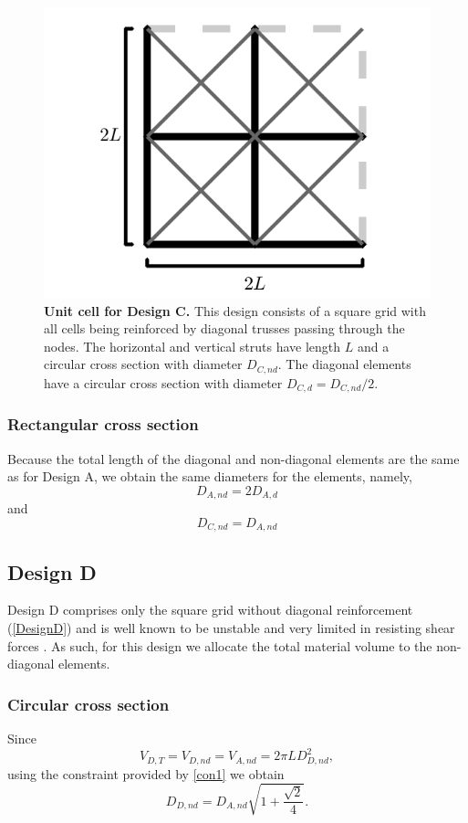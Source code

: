 \documentclass[10pt,twoside]{fernandes_supp}
\begin{document}
\begin{figure}[H]
    \centering
    \includegraphics[width=0.45\linewidth]{SFig4.png}
    \caption{{\bf Unit cell for Design C.} This design consists of a square grid with all cells being reinforced by diagonal trusses passing through the nodes.  The horizontal and vertical struts have length $L$ and a circular cross section with diameter $D_{C,nd}$. The diagonal elements have a circular cross section  with diameter $D_{C,d}={D_{C,nd}}/{2}$.}
    \label{DesignC}
\end{figure}

\subsubsection{Rectangular cross section}
Because the total length of the diagonal and non-diagonal elements are the same as for Design A, we obtain the same diameters for the elements, namely,
\begin{equation}
D_{A,nd}=2D_{A,d}
\end{equation}
and
\begin{equation}
D_{C,nd}=D_{A,nd}
\end{equation}


\subsection{Design D} 
Design D comprises only the square grid without diagonal reinforcement (\cref{DesignD}) and is well known to be unstable and very limited in resisting shear forces \citep{gibson1999,deshpande2001}. As such, for this design we allocate the total material volume to the non-diagonal elements.

\subsubsection{Circular cross section}
Since
\begin{equation}
V_{D,T}=V_{D,nd}=V_{A,nd}=2\pi L D_{D,nd}^2,
\end{equation}
using the constraint provided by \cref{con1} we obtain
\begin{equation}
{D_{D,nd}}={D_{A,nd}}\sqrt{1+\frac{\sqrt{2}}{4}}. 
\end{equation}
\end{document}
